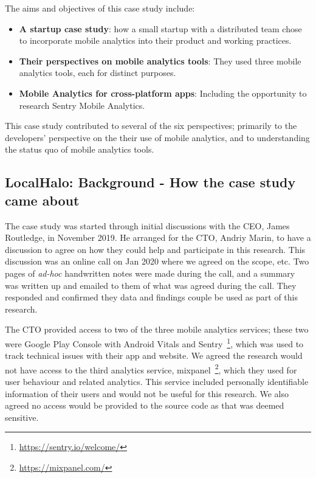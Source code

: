 The aims and objectives of this case study include:
\begin{itemize}
    \item \textbf{A startup case study}: how a small startup with a distributed team chose to incorporate mobile analytics into their product and working practices.
    \item \textbf{Their perspectives on mobile analytics tools}: They used three mobile analytics tools, each for distinct purposes. 
    \item \textbf{Mobile Analytics for cross-platform apps}: Including the opportunity to research Sentry Mobile Analytics. 
\end{itemize}

This case study contributed to several of the six perspectives; primarily to the developers' perspective on the their use of mobile analytics, and to understanding the status quo of mobile analytics tools.



\subsection{LocalHalo: Background - How the case study came about}
The case study was started through initial discussions with the CEO, James Routledge, in November 2019. He arranged for the CTO, Andriy Marin, to have a discussion to agree on how they could help and participate in this research. This discussion was an online call on  Jan 2020 where we agreed on the scope, etc. Two pages of \emph{ad-hoc} handwritten notes were made during the call, and a summary was written up and emailed to them of what was agreed during the call. They responded and confirmed they data and findings couple be used as part of this research.

The CTO provided access to two of the three mobile analytics services; these two were Google Play Console with Android Vitals and Sentry~\footnote{\url{https://sentry.io/welcome/}}, which was used to track technical issues with their app and website. We agreed the research would not have access to the third analytics service, mixpanel~\footnote{\url{https://mixpanel.com/}}, which they used for user behaviour and related analytics. This service included personally identifiable information of their users and would not be useful for this research. We also agreed no access would be provided to the source code as that was deemed sensitive. 

